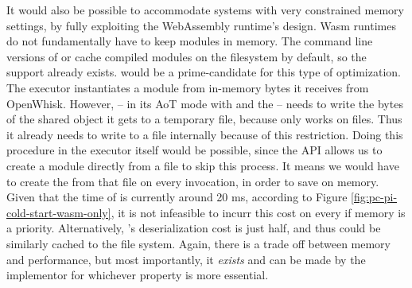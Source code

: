 It would also be possible to accommodate systems with very constrained memory settings, by fully exploiting the WebAssembly runtime's design. Wasm runtimes do not fundamentally have to keep modules in memory. The command line versions of  or  cache compiled modules on the filesystem by default, so the support already exists.  would be a prime-candidate for this type of optimization. The executor instantiates a module from in-memory bytes it receives from OpenWhisk. However,  -- in its AoT mode with  and the  -- needs to write the bytes of the shared object it gets to a temporary file, because  only works on files. Thus it already needs to write to a file internally because of this restriction. Doing this procedure in the executor itself would be possible, since the API allows us to create a module directly from a file to skip this process. It means we would have to create the  from that file on every  invocation, in order to save on memory. Given that the  time of  is currently around 20 ms, according to Figure \ref{fig:pc-pi-cold-start-wasm-only}, it is not infeasible to incurr this cost on every  if memory is a priority. Alternatively, 's deserialization cost is just half, and thus could be similarly cached to the file system. Again, there is a trade off between memory and performance, but most importantly, it \emph{exists} and can be made by the implementor for whichever property is more essential.
